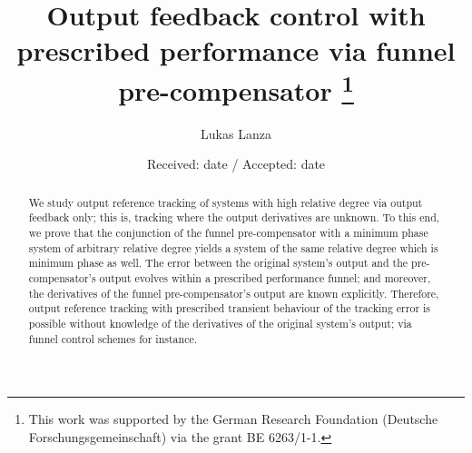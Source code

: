 \documentclass[ envcountsect, envcountsame]{svjour3}
\begin{document}
%
\title{ Output feedback control with prescribed performance via funnel pre-compensator
\thanks{This work was supported by the German Research Foundation
(Deutsche Forschungsgemeinschaft) via the grant BE 6263/1-1.}
}

\author{Lukas Lanza}

\date{Received: date / Accepted: date}

\maketitle

\begin{abstract}
We study output reference tracking of systems with high relative degree via output feedback only; this is, tracking where the output derivatives are unknown.
To this end, we prove that the conjunction of the funnel pre-compensator with a minimum phase system of arbitrary relative degree yields a system of the same relative degree which is minimum phase as well. 
The error between the original system's output and the pre-compensator's output evolves within a prescribed performance funnel; and moreover, the derivatives of the funnel pre-compensator's output are known explicitly. 
Therefore, output reference tracking with prescribed transient behaviour of the tracking error is possible without knowledge of the derivatives of the original system's output; via funnel control schemes for instance.
%
\end{abstract}
\end{document}
